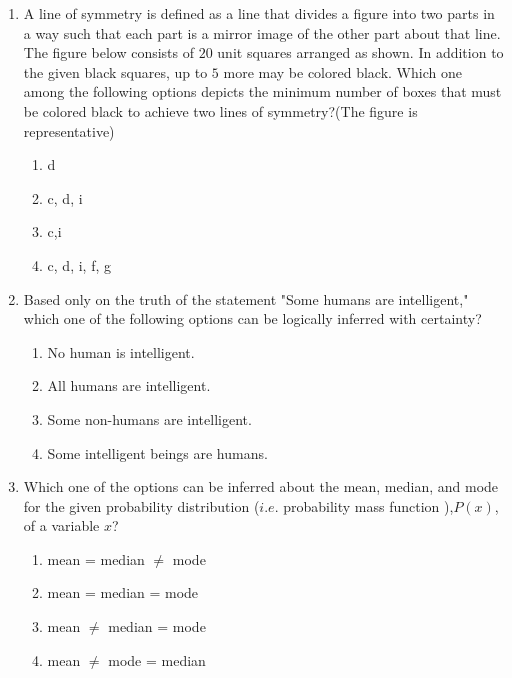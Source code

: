 \documentclass[journal,12pt,onecolumn]{IEEEtran}
\theoremstyle{remark}
\begin{document}
\begin{enumerate}
\begin{enumerate}
    \end{enumerate}
    \item A line of symmetry is defined as a line that divides a figure into two parts in a way such that each part is a mirror image of the other part about that line.\\
    The figure below consists of $20$ unit squares arranged as shown. In addition to the given black squares, up to $5$ more may be colored black. Which one among the following options depicts the minimum number of boxes that must be colored black to achieve two lines of symmetry?(The figure is representative)
\begin{figure}[H]
        \centering
         
    \end{figure}
    \begin{enumerate}
        \item d
        \item c, d, i
        \item c,i
        \item c, d, i, f, g
    \end{enumerate}
    \item Based only on the truth of the statement "Some humans are intelligent," which one of the following options can be logically inferred with certainty?
    \begin{enumerate}
        \item No human is intelligent.
        \item All humans are intelligent.
        \item Some non-humans are intelligent.
        \item Some intelligent beings are humans.
    \end{enumerate}
    \item Which one of the options can be inferred about the mean, median, and mode for the given probability distribution ($i.e.$ probability mass function ),$P(x)$, of a variable $x$?
      \begin{figure}[H]
        \centering
         
    \end{figure}
    \begin{enumerate}
        \item mean = median $\neq$ mode
        \item mean = median = mode
        \item mean $\neq$ median = mode
        \item mean $\neq$ mode = median
    \end{enumerate}

\end{enumerate}
\end{document}
